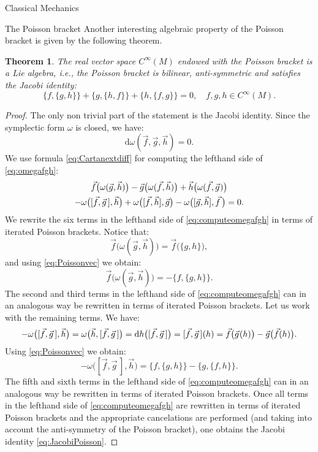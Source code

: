 \documentclass[oneside,a4paper,11pt]{amsbook}
\newcommand{\dd}{\mathrm d}
\newcommand{\microspace}{\mskip1mu}
\theoremstyle{remark}\newtheorem{exercise}{Exercise}[chapter]
\theoremstyle{plain}\newtheorem{teo}{Theorem}[section]
\theoremstyle{plain}\newtheorem{lem}[teo]{Lemma}
\theoremstyle{plain}\newtheorem{prop}[teo]{Proposition}
\theoremstyle{plain}\newtheorem{cor}[teo]{Corollary}
\theoremstyle{definition}\newtheorem{defin}[teo]{Definition}
\theoremstyle{remark}\newtheorem{rem}[teo]{Remark}
\theoremstyle{definition}\newtheorem{notation}[teo]{Notation}
\theoremstyle{definition}\newtheorem{convention}[teo]{Convention}
\theoremstyle{definition}\newtheorem{example}[teo]{Example}
\numberwithin{section}{chapter}
\numberwithin{equation}{section}
\begin{document}
\begin{chapter}{Classical Mechanics}
\begin{section}{The Poisson bracket}
Another interesting algebraic property of the Poisson bracket is given by the following theorem.
\begin{teo}
The real vector space $C^\infty(M)$ endowed with the Poisson bracket is a Lie algebra, i.e., the Poisson bracket is bilinear, anti-symmetric and
satisfies the {\em Jacobi identity}:
\begin{equation}\label{eq:JacobiPoisson}
\{f,\{g,h\}\}+\{g,\{h,f\}\}+\{h,\{f,g\}\}=0,\quad f,g,h\in C^\infty(M).
\end{equation}
\end{teo}
\begin{proof}
The only non trivial part of the statement is the Jacobi identity. Since the symplectic form $\omega$ is closed, we have:
\begin{equation}\label{eq:omegafgh}
\dd\omega(\vec f,\vec g,\vec h)=0.
\end{equation}
We use formula \eqref{eq:Cartanextdiff} for computing the lefthand side of \eqref{eq:omegafgh}:
\begin{multline}\label{eq:computeomegafgh}
\vec f\big(\omega(\vec g,\vec h)\big)-\vec g\big(\omega(\vec f,\vec h)\big)+\vec h\big(\omega(\vec f,\vec g\microspace)\big)\\
-\omega\big([\vec f,\vec g\,],\vec h\big)
+\omega\big([\vec f,\vec h],\vec g\big)-\omega\big([\vec g,\vec h],\vec f\,\big)=0.
\end{multline}
We rewrite the six terms in the lefthand side of \eqref{eq:computeomegafgh} in terms of iterated Poisson brackets. Notice that:
\[\vec f\big(\omega(\vec g,\vec h)\big)=\vec f\big(\{g,h\}\big),\]
and using \eqref{eq:Poissonvec} we obtain:
\[\vec f\big(\omega(\vec g,\vec h)\big)=-\{f,\{g,h\}\}.\]
The second and third terms in the lefthand side of \eqref{eq:computeomegafgh} can in an analogous way be rewritten in terms of iterated Poisson brackets.
Let us work with the remaining terms. We have:
\[-\omega\big([\vec f,\vec g\,],\vec h\big)=\omega\big(\vec h,[\vec f,\vec g\,]\big)=\dd h\big([\vec f,\vec g\,]\big)=
[\vec f,\vec g\,](h)=\vec f\big(\vec g\microspace(h)\big)-\vec g\big(\vec f(h)\big).\]
Using \eqref{eq:Poissonvec} we obtain:
\[-\omega\big([\vec f,\vec g\,],\vec h\big)=\{f,\{g,h\}\}-\{g,\{f,h\}\}.\]
The fifth and sixth terms in the lefthand side of \eqref{eq:computeomegafgh} can in an analogous way be rewritten in terms of iterated Poisson brackets.
Once all terms in the lefthand side of \eqref{eq:computeomegafgh} are rewritten in terms of iterated Poisson brackets and the appropriate cancelations
are performed (and taking into account the anti-symmetry of the Poisson bracket), one obtains the Jacobi identity \eqref{eq:JacobiPoisson}.
\end{proof}


\end{section}
\end{chapter}
\end{document}
